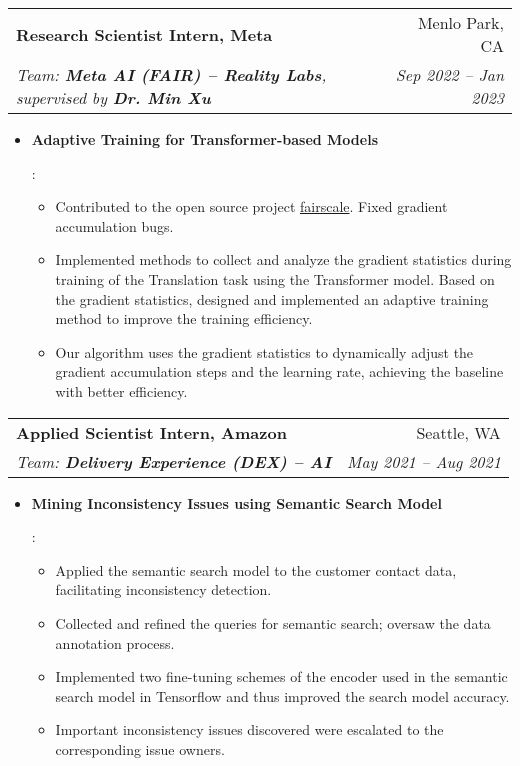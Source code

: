 \documentclass[letterpaper,12pt]{article}
\makeatletter
\newcommand{\resumeItem}[2]{
  \item\small{
    \textbf{#1}{: #2 \vspace{-2pt}}
  }
}
\newcommand{\resumeSubheading}[4]{
  \vspace{-1pt}\item
    \begin{tabular*}{0.97\textwidth}[t]{l@{\extracolsep{\fill}}r}
      \textbf{#1} & #2 \\
      \textit{\small#3} & \textit{\small #4} \\
    \end{tabular*}\vspace{-5pt}
}
\newcommand{\resumeItemListStart}{\begin{itemize}}
\newcommand{\resumeItemListEnd}{\end{itemize}\vspace{-5pt}}
\makeatother
\begin{document}
\resumeSubheading {Research Scientist Intern, Meta}{Menlo Park, CA}
{Team: \textup{\textbf{Meta AI (FAIR) -- Reality Labs}, supervised by \textbf{Dr. Min Xu}}}{Sep 2022 -- Jan 2023}
\resumeItemListStart
\resumeItem{Adaptive Training for Transformer-based Models}{
  \begin{itemize}
    \item Contributed to the open source project \href{https://github.com/facebookresearch/fairscale}{fairscale}.
    Fixed gradient accumulation bugs.
    \item Implemented methods to collect and analyze the gradient statistics during training of the Translation task using the Transformer model.
    Based on the gradient statistics, designed and implemented an adaptive training method to improve the training efficiency.
    \item Our algorithm uses the gradient statistics to dynamically adjust the gradient accumulation steps and the learning rate, achieving the baseline with better efficiency.
  \end{itemize}
}
\resumeItemListEnd

\resumeSubheading {Applied Scientist Intern, Amazon}{Seattle, WA}
{Team: \textup{\textbf{Delivery Experience (DEX) -- AI}}}{May 2021 -- Aug 2021}
\resumeItemListStart
\resumeItem{Mining Inconsistency Issues using Semantic Search Model}{
  \begin{itemize}
    \item Applied the semantic search model to the customer contact data, facilitating inconsistency detection.
    \item Collected and refined the queries for semantic search; oversaw the data annotation process.
    \item Implemented two fine-tuning schemes of the encoder used in the semantic search model in Tensorflow and thus improved the search model accuracy.
    \item Important inconsistency issues discovered were escalated to the corresponding issue owners.
  \end{itemize}
}
\resumeItemListEnd

\end{document}
